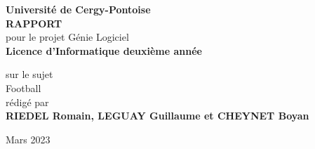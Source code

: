 
\begin{titlepage}{
    \begin{center}
        \vspace* {25mm}
        {\Large \textbf {Université de Cergy-Pontoise}} \\
        \vspace* {10mm}
        {\Large \textbf {RAPPORT}} \\
        \vspace* {10mm}
        pour le projet Génie Logiciel \\
        \textbf {Licence d'Informatique deuxième année} \\
        \vspace* {10mm}

	sur le sujet \\
        \vspace* {10mm}
	{\Huge \textsf{Football}} \\
        \vspace* {10mm}
 	rédigé par \\
        \vspace* {10mm}
        {\Large \textbf {RIEDEL Romain, LEGUAY Guillaume et CHEYNET Boyan}} \\
				\vspace* {10mm}
        \date MMars 2023
        \vspace* {10mm}
	\end{center}
}
\end{titlepage}
